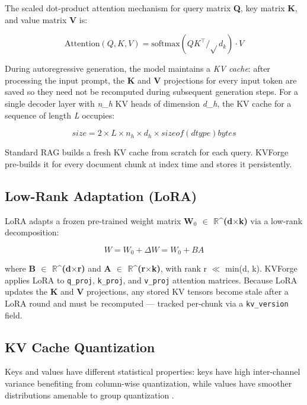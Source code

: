 \documentclass[10pt,twocolumn]{article}
\begin{document}
The scaled dot-product attention mechanism \cite{ref2} for query matrix \textbf{Q}, key matrix \textbf{K}, and value matrix \textbf{V} is:


\[
  \mathrm{Attention}(Q, K, V) = \mathrm{soft\mathrm{max}}(Q K^\top / \sqrt{}d_{k}) \cdot  V
\]

During autoregressive generation, the model maintains a \textit{KV cache}: after processing the input prompt, the \textbf{K} and \textbf{V} projections for every input token are saved so they need not be recomputed during subsequent generation steps. For a single decoder layer with \textit{n\_h} KV heads of dimension \textit{d\_h}, the KV cache for a sequence of length \textit{L} occupies:


\[
  size = 2 \times  L \times  n_{h} \times  d_{h} \times  sizeof(dtype)  bytes
\]

Standard RAG builds a fresh KV cache from scratch for each query. KVForge pre-builds it for every document chunk at index time and stores it persistently.


\subsection{Low-Rank Adaptation (LoRA)}

LoRA \cite{ref4} adapts a frozen pre-trained weight matrix \textbf{W$_0$ $\in$ $\mathbb{R}$\textasciicircum{}(d$\times$k)} via a low-rank decomposition:


\[
  W = W_{0} + \Delta W = W_{0} + BA
\]

where \textbf{B $\in$ $\mathbb{R}$\textasciicircum{}(d$\times$r)} and \textbf{A $\in$ $\mathbb{R}$\textasciicircum{}(r$\times$k)}, with rank r $\ll$ min(d, k). KVForge applies LoRA to \texttt{q\_proj}, \texttt{k\_proj}, and \texttt{v\_proj} attention matrices. Because LoRA updates the \textbf{K} and \textbf{V} projections, any stored KV tensors become stale after a LoRA round and must be recomputed --- tracked per-chunk via a \texttt{kv\_version} field.


\subsection{KV Cache Quantization}

Keys and values have different statistical properties: keys have high inter-channel variance benefiting from column-wise quantization, while values have smoother distributions amenable to group quantization \cite{ref18,ref19}.
\end{document}
